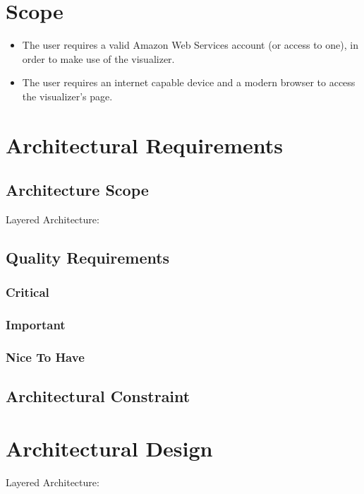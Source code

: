 \documentclass[hidelinks,a4paper,12pt]{article}
\begin{document}
\section{Scope}
\begin {itemize}
	\item The user requires a valid Amazon Web Services account (or access to one), in order to make use of the visualizer.
	\item The user requires an internet capable device and a modern browser to access the visualizer's page.
\end{itemize}
\newpage

\section{Architectural Requirements}

	\subsection{Architecture Scope}
	Layered Architecture: 
	

	\subsection{Quality Requirements}
		\subsubsection {Critical}
		\subsubsection {Important}
		\subsubsection {Nice To Have}
	\subsection{Architectural Constraint}
	
\section{Architectural Design}
Layered Architecture: 
\end{document}
